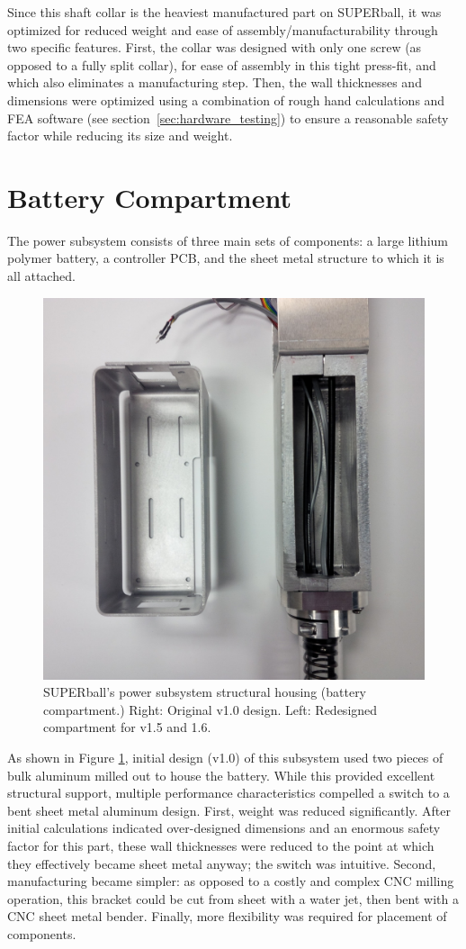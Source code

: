 \documentclass[12pt]{report}
\begin{document}
Since this shaft collar is the heaviest manufactured part on SUPERball, it was optimized for reduced weight and ease of assembly/manufacturability through two specific features.
First, the collar was designed with only one screw (as opposed to a fully split collar), for ease of assembly in this tight press-fit, and which also eliminates a manufacturing step.
Then, the wall thicknesses and dimensions were optimized using a combination of rough hand calculations and FEA software (see section~\ref{sec:hardware_testing}) to ensure a reasonable safety factor while reducing its size and weight.

\section{Battery Compartment}

The power subsystem consists of three main sets of components: a large lithium polymer battery, a controller PCB, and the sheet metal structure to which it is all attached.

\begin{figure}
   \centering
   \includegraphics[width=0.45\columnwidth]{img/battery_compartment} 
   \caption{SUPERball's power subsystem structural housing (battery compartment.) Right: Original v1.0 design. Left: Redesigned compartment for v1.5 and 1.6.~\cite{sabelhaus2014hardware}}
   \label{battery_compartment}
\end{figure}

As shown in Figure \ref{battery_compartment}, initial design (v1.0) of this subsystem used two pieces of bulk aluminum milled out to house the battery.
While this provided excellent structural support, multiple performance characteristics compelled a switch to a bent sheet metal aluminum design.
First, weight was reduced significantly. 
After initial calculations indicated over-designed dimensions and an enormous safety factor for this part, these wall thicknesses were reduced to the point at which they effectively became sheet metal anyway; the switch was intuitive.
Second, manufacturing became simpler: as opposed to a costly and complex CNC milling operation, this bracket could be cut from sheet with a water jet, then bent with a CNC sheet metal bender.
Finally, more flexibility was required for placement of components.
\end{document}
